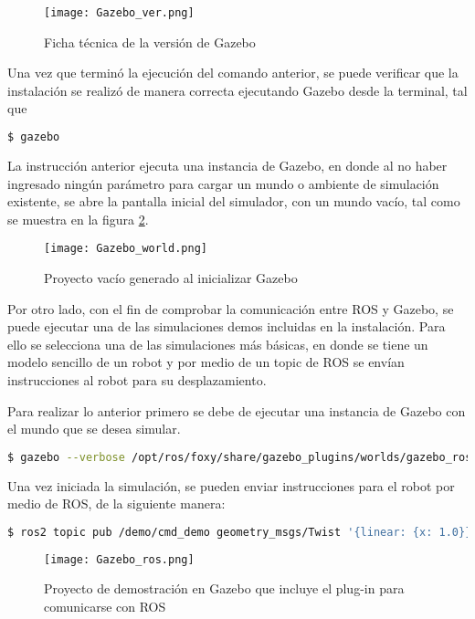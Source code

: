\begin{figure}[ht]
    \centering
    \texttt{[image: Gazebo\_ver.png]}
    \caption{Ficha técnica de la versión de Gazebo}
    \label{fig:Gazebo_ver}
\end{figure}


Una vez que terminó la ejecución del comando anterior, se puede verificar que la instalación se realizó de manera correcta ejecutando Gazebo desde la terminal, tal que

\begin{lstlisting}[language = bash]
    $ gazebo
\end{lstlisting}

La instrucción anterior ejecuta una instancia de Gazebo, en donde al no haber ingresado ningún parámetro para cargar un mundo o ambiente de simulación existente, se abre la pantalla inicial del simulador, con un mundo vacío, tal como se muestra en la figura \ref{fig:Gazebo_world}.

\begin{figure}[ht]
    \centering
    \texttt{[image: Gazebo\_world.png]}
    \caption{Proyecto vacío generado al inicializar Gazebo}
    \label{fig:Gazebo_world}
\end{figure}

Por otro lado, con el fin de comprobar la comunicación entre ROS y Gazebo, se puede ejecutar una de las simulaciones demos incluidas en la instalación. Para ello se selecciona una de las simulaciones más básicas, en donde se tiene un modelo sencillo de un robot y por medio de un topic de ROS se envían instrucciones al robot para su desplazamiento.

Para realizar lo anterior primero se debe de ejecutar una instancia de Gazebo con el mundo que se desea simular.

\begin{lstlisting}[language = bash]
    $ gazebo --verbose /opt/ros/foxy/share/gazebo_plugins/worlds/gazebo_ros_diff_drive_demo.world
\end{lstlisting}

Una vez iniciada la simulación, se pueden enviar instrucciones para el robot por medio de ROS, de la siguiente manera:

\begin{lstlisting}[language = bash]
    $ ros2 topic pub /demo/cmd_demo geometry_msgs/Twist '{linear: {x: 1.0}}' -1
\end{lstlisting}

\begin{figure}[ht]
    \centering
    \texttt{[image: Gazebo\_ros.png]}
    \caption{Proyecto de demostración en Gazebo que incluye el plug-in para comunicarse con ROS}
    \label{fig:Gazebo_ros}
\end{figure}

